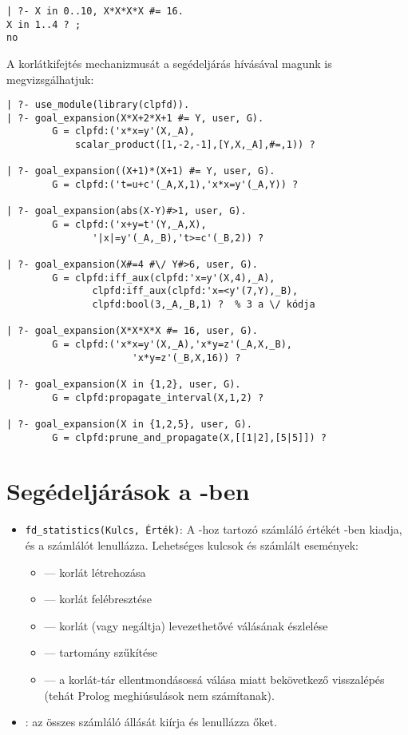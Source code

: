 \begin{verbatim}
| ?- X in 0..10, X*X*X*X #= 16.
X in 1..4 ? ;
no
\end{verbatim}

A korlátkifejtés mechanizmusát a  segédeljárás
hívásával magunk is megvizsgálhatjuk:

\begin{verbatim}
| ?- use_module(library(clpfd)).
| ?- goal_expansion(X*X+2*X+1 #= Y, user, G).
        G = clpfd:('x*x=y'(X,_A),
            scalar_product([1,-2,-1],[Y,X,_A],#=,1)) ? 

| ?- goal_expansion((X+1)*(X+1) #= Y, user, G).
        G = clpfd:('t=u+c'(_A,X,1),'x*x=y'(_A,Y)) ? 

| ?- goal_expansion(abs(X-Y)#>1, user, G).
        G = clpfd:('x+y=t'(Y,_A,X),
               '|x|=y'(_A,_B),'t>=c'(_B,2)) ? 

| ?- goal_expansion(X#=4 #\/ Y#>6, user, G).
        G = clpfd:iff_aux(clpfd:'x=y'(X,4),_A),
               clpfd:iff_aux(clpfd:'x=<y'(7,Y),_B),
               clpfd:bool(3,_A,_B,1) ?  % 3 a \/ kódja

| ?- goal_expansion(X*X*X*X #= 16, user, G).
        G = clpfd:('x*x=y'(X,_A),'x*y=z'(_A,X,_B),
                      'x*y=z'(_B,X,16)) ? 

| ?- goal_expansion(X in {1,2}, user, G).
        G = clpfd:propagate_interval(X,1,2) ? 

| ?- goal_expansion(X in {1,2,5}, user, G).
        G = clpfd:prune_and_propagate(X,[[1|2],[5|5]]) ?
\end{verbatim}

\section{Segédeljárások a \Clpfd -ben}

\begin{itemize}
\item {\tt fd\_statistics(Kulcs, Érték)}: A -hoz tartozó
        számláló értékét -ben kiadja, és a számlálót lenullázza.
        Lehetséges kulcsok és számlált események: 
\begin{itemize}
\item {} --- korlát létrehozása
\item {} --- korlát felébresztése
\item {} --- korlát (vagy negáltja) levezethetővé válásának
        észlelése
\item {}    --- tartomány szűkítése
\item {}  --- a korlát-tár ellentmondásossá válása miatt
        bekövetkező visszalépés (tehát Prolog meghiúsulások nem számítanak).
\end{itemize}
\item {}: az összes számláló állását kiírja és
        lenullázza őket.
\end{itemize}

